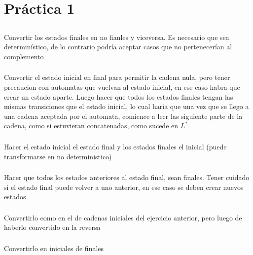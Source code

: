 \section{Práctica 1}

\setcounter{subsection}{3}
\subsection{}
\subsubsection{}
Convertir los estados finales en no fianles y viceversa. Es necesario que sea determinístico, de lo contrario podría aceptar casos que no pertenecerían al complemento

\subsubsection{}
Convertir el estado inicial en final para permitir la cadena nula, pero tener precaucion con automatas que vuelvan al estado inicial, en ese caso habra que crear un estado aparte. Luego hacer que todos los estados finales tengan las mismas transiciones que el estado inicial, lo cual haria que una vez que se llego a una cadena aceptada por el automata, comience a leer las siguiente parte de la cadena, como si estuvieran concatenadas, como sucede en $L^*$

\subsubsection{}
Hacer el estado inicial el estado final y los estados finales el inicial (puede transformarse en no deterministico)

\subsubsection{}
Hacer que todos los estados anteriores al estado final, sean finales. Tener cuidado si el estado final puede volver a uno anterior, en ese caso se deben crear nuevos estados

\subsubsection{}
Convertirlo como en el de cadenas iniciales del ejercicio anterior, pero luego de haberlo convertido en la reversa

\subsubsection{}
Convertirlo en iniciales de finales

